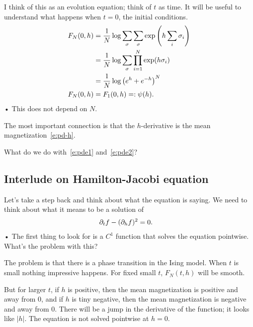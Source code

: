 I think of this as an evolution equation; think of $t$ as time. It will be useful to understand what happens when $t=0$, the initial conditions.
\begin{align}
F_N(0,h) &= \frac{1}{N} \log \sum_\sigma \sum_\sigma \exp\left( {h \sum_i \sigma_i} \right)\\
&= \frac{1}{N} \log \sum_\sigma \prod_{i=1}^{N} \exp(h\sigma_i)\\
&= \frac{1}{N} \log \left( {e^h+e^{-h}} \right)^N\\
F_N(0,h) &= F_1(0,h) =: \psi(h).
\label{e:pde2}
\end{align}•
This does not depend on $N$.

The most important connection %
is that the $h$-derivative is the mean magnetization~\eqref{e:pd-h}.

What do we do with~\eqref{e:pde1} and~\eqref{e:pde2}?  

\subsection{Interlude on Hamilton-Jacobi equation}

Let's take a step back and think about what the equation is saying. We need to think about what it means to be a solution of 
\begin{align}
\label{e:hj}
\partial_t f - (\partial_h f)^2&=0.
\end{align}•
The first thing to look for is a $C^1$ function that solves the equation pointwise. What's the problem with this?

The problem is that there is a phase transition in the Ising model. When $t$ is small nothing impressive happens. For fixed small $t$, $F_N(t,h)$ will be smooth. 

But for larger $t$, if $h$ is positive, then the mean magnetization is positive and away from 0, and if $h$ is tiny negative, then the mean magnetization is negative and away from 0. There will be a jump in the derivative of the function; it looks like $|h|$. The equation is not solved pointwise at $h=0$.

